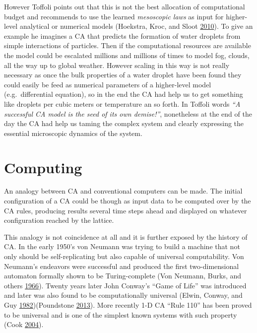 \documentclass[
  openany]{book}
\begin{document}
However Toffoli points out that this is not the best allocation of computational budget and recommends to use the learned \emph{mesoscopic laws} as input for higher-level analytical or numerical models (Hoekstra, Kroc, and Sloot \protect\hyperlink{ref-hoekstra2010simulating}{2010}). To give an example he imagines a CA that predicts the formation of water droplets from simple interactions of particles. Then if the computational resources are available the model could be escalated millions and millions of times to model fog, clouds, all the way up to global weather. However scaling in this way is not really necessary as once the bulk properties of a water droplet have been found they could easily be feed as numerical parameters of a higher-level model (e.g.~differential equation), so in the end the CA had help us to get something like droplets per cubic meters or temperature an so forth. In Toffoli words \emph{``A successful CA model is the seed of its own demise!''}, nonetheless at the end of the day the CA had help us taming the complex system and clearly expressing the essential microscopic dynamics of the system.

\hypertarget{computing}{%
\section{Computing}\label{computing}}

An analogy between CA and conventional computers can be made. The initial configuration of a CA could be though as input data to be computed over by the CA rules, producing results several time steps ahead and displayed on whatever configuration reached by the lattice.

This analogy is not coincidence at all and it is further exposed by the history of CA. In the early 1950's von Neumann was trying to build a machine that not only should be self-replicating but also capable of universal computability. Von Neumann's endeavors were successful and produced the first two-dimensional automaton formally shown to be Turing-complete (Von Neumann, Burks, and others \protect\hyperlink{ref-von1966theory}{1966}). Twenty years later John Conway's ``Game of Life'' was introduced and later was also found to be computationally universal (Elwin, Conway, and Guy \protect\hyperlink{ref-elwin1982winning}{1982})(Poundstone \protect\hyperlink{ref-poundstone2013recursive}{2013}). More recently 1-D CA ``Rule 110'' has been proved to be universal and is one of the simplest known systems with such property (Cook \protect\hyperlink{ref-cook2004universality}{2004}).
\end{document}
